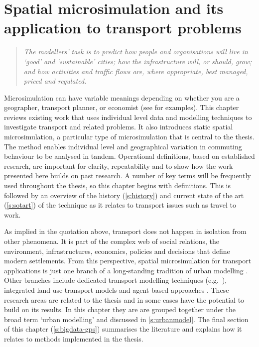 
\chapter{Spatial microsimulation and its application to transport problems}
\label{Chapter3}
\fancyhead[RE,LO]{\thepage}

\begin{quote}
\textit{The modellers' task is to predict how people and organisations will live
in
`good' and `sustainable' cities; how the infrastructure will, or should, grow;
and how activities and traffic flows are, where appropriate, best managed,
priced and regulated.}
\end{quote}

Microsimulation can have variable meanings depending on whether you are a
geographer, transport planner, or economist
(see \citealp{Ballas2005b, Liu2006, Bourguignon2006} for examples).
This chapter reviews existing work that uses individual level data and modelling
techniques to investigate transport and related problems.
It also introduces static spatial microsimulation, a particular type of
microsimulation that is central to the thesis. The method enables
individual level and geographical variation in commuting behaviour
to be analysed in tandem. Operational definitions, based on
established research, are important for clarity, repeatability and to
show how the work presented here builds on past research. A number of key terms will be
frequently used throughout the thesis, so this chapter begins with
definitions.
This is followed by an overview of the history (\cref{s:history}) and current
state of the art (\cref{s:sotart}) of the technique as it relates to transport
issues such as travel to work.

As implied in the quotation above, transport does not happen in isolation from
other phenomena. It is part of the complex web of social relations, the environment,
infrastructures, economics, policies and decisions
that define modern settlements. From this
perspective, spatial microsimulation for transport applications is just one
branch of a long-standing tradition of urban modelling
\citep{Wilson1970, batty1976urban, batty2007cities}.
Other branches include dedicated transport modelling techniques
(e.g.~\citealp{SATURN2012}), integrated land-use transport  models
\citep{Wegener2009} and agent-based approaches \citep{Gilbert2008-abm}.
These research areas are related to the thesis and in some cases have
the potential to build on its results. In this chapter they are
are grouped together under the broad term `urban modelling' and
discussed in \cref{s:urbanmodel}. The final section of
this chapter (\cref{s:bigdata-gps}) summarises the literature and
explains how it relates to methods implemented in the thesis.

